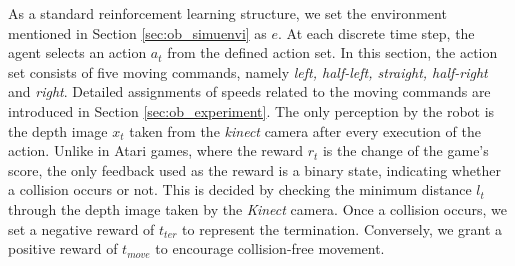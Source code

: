 As a standard reinforcement learning structure, we set the environment mentioned in Section \ref{sec:ob_simuenvi} as $e$. At each discrete time step, the agent selects an action $ a_t $ from the defined action set. In this section, the action set consists of five moving commands, namely \textit{left, half-left, straight, half-right} and \textit{right}. Detailed assignments of speeds related to the moving commands are introduced in Section \ref{sec:ob_experiment}. The only perception by the robot is the depth image $x_t$ taken from the \textit{kinect} camera after every execution of the action. Unlike in Atari games, where the reward $r_t$ is the change of the game's score, the only feedback used as the reward is a binary state, indicating whether a collision occurs or not. This is decided by checking the minimum distance $l_t$ through the depth image taken by the \textit{Kinect} camera. Once a collision occurs, we set a negative reward of $t_{ter}$ to represent the termination. Conversely,
we grant a positive reward of $t_{move}$ to encourage collision-free movement.

